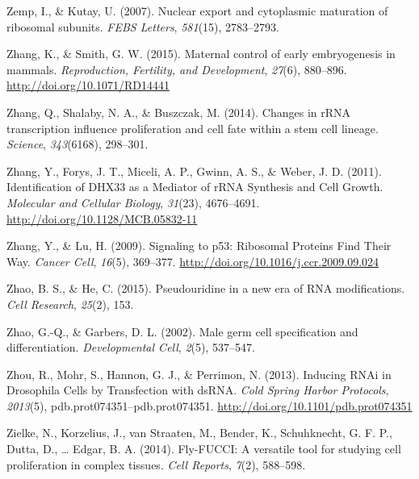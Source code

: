 \documentclass[12pt,oneside]{reedthesis}
\newlength{\cslhangindent}
\newenvironment{cslreferences}%
  {\setlength{\parindent}{0pt}%
  \everypar{\setlength{\hangindent}{\cslhangindent}}\ignorespaces}%
  {\par}
\begin{document}
\begin{cslreferences}
\leavevmode\hypertarget{ref-Zemp2007}{}%
Zemp, I., \& Kutay, U. (2007). Nuclear export and cytoplasmic maturation of ribosomal subunits. \emph{FEBS Letters}, \emph{581}(15), 2783--2793.

\leavevmode\hypertarget{ref-Zhang2015c}{}%
Zhang, K., \& Smith, G. W. (2015). Maternal control of early embryogenesis in mammals. \emph{Reproduction, Fertility, and Development}, \emph{27}(6), 880--896. \url{http://doi.org/10.1071/RD14441}

\leavevmode\hypertarget{ref-Zhang2014d}{}%
Zhang, Q., Shalaby, N. A., \& Buszczak, M. (2014). Changes in rRNA transcription influence proliferation and cell fate within a stem cell lineage. \emph{Science}, \emph{343}(6168), 298--301.

\leavevmode\hypertarget{ref-zhangIdentificationDHX33Mediator2011}{}%
Zhang, Y., Forys, J. T., Miceli, A. P., Gwinn, A. S., \& Weber, J. D. (2011). Identification of DHX33 as a Mediator of rRNA Synthesis and Cell Growth. \emph{Molecular and Cellular Biology}, \emph{31}(23), 4676--4691. \url{http://doi.org/10.1128/MCB.05832-11}

\leavevmode\hypertarget{ref-zhangSignalingP53Ribosomal2009}{}%
Zhang, Y., \& Lu, H. (2009). Signaling to p53: Ribosomal Proteins Find Their Way. \emph{Cancer Cell}, \emph{16}(5), 369--377. \url{http://doi.org/10.1016/j.ccr.2009.09.024}

\leavevmode\hypertarget{ref-Zhao2015}{}%
Zhao, B. S., \& He, C. (2015). Pseudouridine in a new era of RNA modifications. \emph{Cell Research}, \emph{25}(2), 153.

\leavevmode\hypertarget{ref-Zhao2002d}{}%
Zhao, G.-Q., \& Garbers, D. L. (2002). Male germ cell specification and differentiation. \emph{Developmental Cell}, \emph{2}(5), 537--547.

\leavevmode\hypertarget{ref-zhouInducingRNAiDrosophila2013}{}%
Zhou, R., Mohr, S., Hannon, G. J., \& Perrimon, N. (2013). Inducing RNAi in Drosophila Cells by Transfection with dsRNA. \emph{Cold Spring Harbor Protocols}, \emph{2013}(5), pdb.prot074351--pdb.prot074351. \url{http://doi.org/10.1101/pdb.prot074351}

\leavevmode\hypertarget{ref-Zielke2014a}{}%
Zielke, N., Korzelius, J., van Straaten, M., Bender, K., Schuhknecht, G. F. P., Dutta, D., \ldots{} Edgar, B. A. (2014). Fly-FUCCI: A versatile tool for studying cell proliferation in complex tissues. \emph{Cell Reports}, \emph{7}(2), 588--598.
\end{cslreferences}

\end{document}
